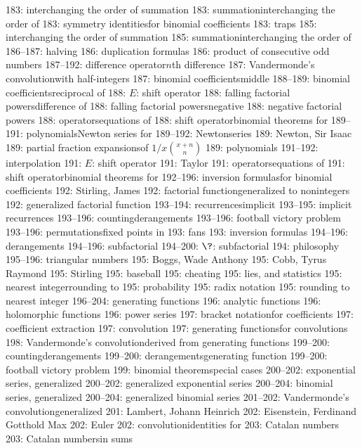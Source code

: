 183: interchanging the order of summation
183: summation\sub interchanging the order of
183: symmetry identities\sub for binomial coefficients
183: traps
185: interchanging the order of summation
185: summation\sub interchanging the order of
186--187: halving
186: duplication formulas
186: product of consecutive odd numbers
187--192: difference operator\sub $n$th difference
187: Vandermonde's convolution\sub with half-integers
187: binomial coefficients\sub middle
188--189: binomial coefficients\sub reciprocal of
188: $E$: shift operator
188: falling factorial powers\sub difference of
188: falling factorial powers\sub negative
188: negative factorial powers
188: operators\sub equations of
188: shift operator\sub binomial theorems for
189--191: polynomials\sub Newton series for
189--192: Newton\sub series
189: Newton, Sir Isaac
189: partial fraction expansions\sub of $1/x{x+n\choose n}$
189: polynomials
191--192: interpolation
191: $E$: shift operator
191: Taylor
191: operators\sub equations of
191: shift operator\sub binomial theorems for
192--196: inversion formulas\sub for binomial coefficients
192: Stirling, James
192: factorial function\sub generalized to nonintegers
192: generalized factorial function
193--194: recurrences\sub implicit
193--195: implicit recurrences
193--196: counting\sub derangements
193--196: football victory problem
193--196: permutations\sub fixed points in
193: fans
193: inversion formulas
194--196: derangements
194--196: subfactorial
194--200: $\?$: subfactorial
194: philosophy
195--196: triangular numbers
195: Boggs, Wade Anthony
195: Cobb, Tyrus Raymond
195: Stirling
195: baseball
195: cheating
195: lies, and statistics
195: nearest integer\sub rounding to
195: probability
195: radix notation
195: rounding to nearest integer
196--204: generating functions
196: analytic functions
196: holomorphic functions
196: power series
197: bracket notation\sub for coefficients
197: coefficient extraction
197: convolution
197: generating functions\sub for convolutions
198: Vandermonde's convolution\sub derived from generating functions
199--200: counting\sub derangements
199--200: derangements\sub generating function
199--200: football victory problem
199: binomial theorem\sub special cases
200--202: exponential series, generalized
200--202: generalized exponential series
200--204: binomial series, generalized
200--204: generalized binomial series
201--202: Vandermonde's convolution\sub generalized
201: Lambert, Johann Heinrich
202: Eisenstein, Ferdinand Gotthold Max
202: Euler
202: convolution\sub identities for
203: Catalan numbers
203: Catalan numbers\sub in sums
